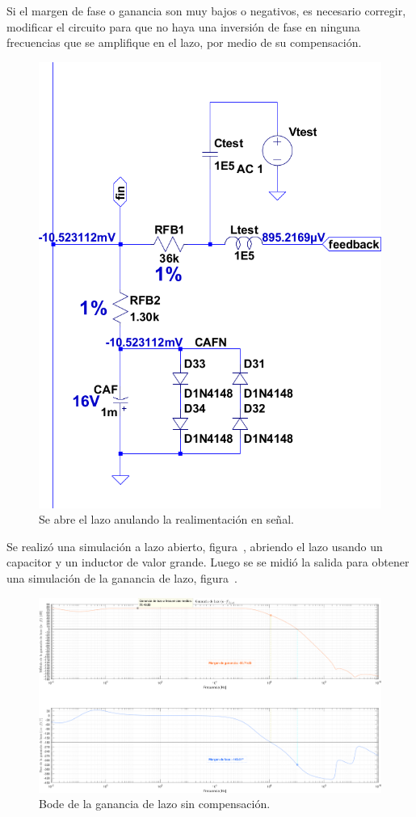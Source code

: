 Si el margen de fase o ganancia son muy bajos o negativos, es necesario corregir, modificar el circuito para que no haya una inversión de fase en ninguna frecuencias que se amplifique en el lazo, por medio de su compensación.


\begin{figure}[H]
	\centering
	\includegraphics[height=0.35\textwidth]{img/sims/ala}
	\caption{Se abre el lazo anulando la realimentación en señal.}
	\label{fig:ala}
\end{figure}


Se realizó una simulación a lazo abierto, figura~, abriendo el lazo usando un capacitor y un inductor de valor grande. Luego se se midió la salida para obtener una simulación de la ganancia de lazo, figura~.




\clearpage

\begin{figure}[H]
	\centering
	\includegraphics[width=0.85\paperwidth, angle=90]{img/sims/gain_loop_NC.png}
	\caption{Bode de la ganancia de lazo sin compensación.}
	\label{fig:bode-la-sin-comp}
\end{figure}

\clearpage



